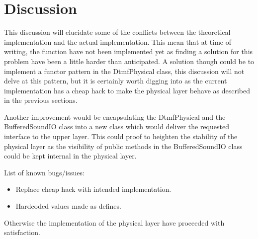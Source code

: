 \section{Discussion}
This discussion will elucidate some of the conflicts between the theoretical implementation and the actual implementation. This mean that at time of writing, the  function have not been implemented yet as finding a solution for this problem have been a little harder than anticipated. A solution though could be to implement a functor pattern in the DtmfPhysical class, this discussion will not delve at this pattern, but it is certainly worth digging into as the current implementation has a cheap hack to make the physical layer behave as described in the previous sections.

Another improvement would be encapsulating the DtmfPhysical and the BufferedSoundIO class into a new class which would deliver the requested interface to the upper layer. This could proof to heighten the stability of the physical layer as the visibility of public methods in the BufferedSoundIO class could be kept internal in the physical layer.

List of known bugs/issues:
\begin{itemize}
\item Replace cheap hack with intended implementation.
\item Hardcoded values made as defines.
\end{itemize}

Otherwise the implementation of the physical layer have proceeded with satisfaction.